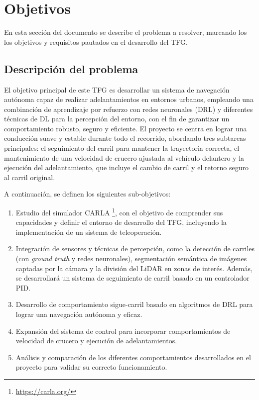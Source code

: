 \chapter{Objetivos}
\label{cap:capitulo2}

En esta sección del documento se describe el problema a resolver, marcando los los objetivos y requisitos pautados en el desarrollo del \ac{TFG}.

\section{Descripción del problema}
\label{sec:descripcion}

El objetivo principal de este \ac{TFG} es desarrollar un sistema de navegación autónoma capaz de realizar adelantamientos en entornos urbanos, empleando una combinación de aprendizaje por refuerzo con redes neuronales (\ac{DRL}) y diferentes técnicas de \ac{DL} para la percepción del entorno, con el fin de garantizar un comportamiento robusto, seguro y eficiente. El proyecto se centra en lograr una conducción suave y estable durante todo el recorrido, abordando tres subtareas principales: el seguimiento del carril para mantener la trayectoria correcta, el mantenimiento de una velocidad de crucero ajustada al vehículo delantero y la ejecución del adelantamiento, que incluye el cambio de carril y el retorno seguro al carril original.

A continuación, se definen los siguientes sub-objetivos: 

\begin{enumerate}
    \item Estudio del simulador CARLA \footnote{\url{https://carla.org/}}, con el objetivo de comprender sus capacidades y definir el entorno de desarrollo del \ac{TFG}, incluyendo la implementación de un sistema de teleoperación.
    \item Integración de sensores y técnicas de percepción, como la detección de carriles (con \textit{ground truth} y redes neuronales), segmentación semántica de imágenes captadas por la cámara y la división del \ac{LiDAR} en zonas de interés. Además, se desarrollará un sistema de seguimiento de carril basado en un controlador \ac{PID}.
    \item Desarrollo de comportamiento sigue-carril basado en algoritmos de \ac{DRL} para lograr una navegación 
    autónoma y eficaz.
    \item Expansión del sistema de control para incorporar comportamientos de velocidad de crucero y ejecución de adelantamientos.
    \item Análisis y comparación de los diferentes comportamientos desarrollados en el proyecto para validar su correcto funcionamiento.
\end{enumerate}

